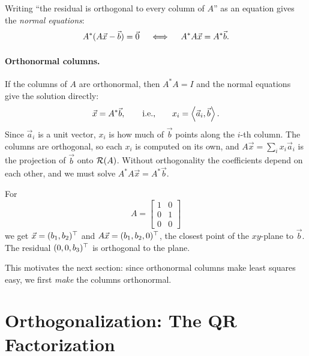 Writing ``the residual is orthogonal to every column of $A$'' as an equation gives the \emph{normal equations}:
\begin{equation}
  A^\ast(A\vec{x} - \vec{b}) = \vec{0} \quad\iff\quad A^\ast A\vec{x} = A^\ast\vec{b}. \label{eq:normal}
\end{equation}

\paragraph{Orthonormal columns.} If the columns of $A$ are orthonormal, then $A^\ast A = I$ and the normal equations give the solution directly:
\begin{equation}
  \vec{x} = A^\ast\vec{b}, \qquad\text{i.e.,}\qquad x_i = \left\langle \vec{a}_i, \vec{b} \right\rangle.
\end{equation}
Since $\vec{a}_i$ is a unit vector, $x_i$ is how much of $\vec{b}$ points along the $i$-th column. The columns are orthogonal, so each $x_i$ is computed on its own, and $A\vec{x} = \sum_i x_i\vec{a}_i$ is the projection of $\vec{b}$ onto $\mathcal{R}(A)$. Without orthogonality the coefficients depend on each other, and we must solve $A^\ast A\vec{x} = A^\ast\vec{b}$.

\begin{example}
  For
  \begin{equation}
    A = \begin{bmatrix} 1 & 0 \\ 0 & 1 \\ 0 & 0 \end{bmatrix}
  \end{equation}
  we get $\vec{x} = (b_1, b_2)^\top$ and $A\vec{x} = (b_1, b_2, 0)^\top$, the closest point of the $xy$-plane to $\vec{b}$. The residual $(0, 0, b_3)^\top$ is orthogonal to the plane.
\end{example}

This motivates the next section: since orthonormal columns make least squares easy, we first \emph{make} the columns orthonormal.

\section{Orthogonalization: The QR Factorization}

